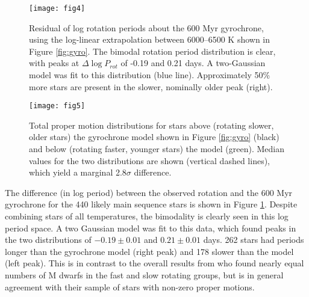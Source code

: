 \documentclass[manuscript, letterpaper]{aastex6}
\begin{document}
\begin{figure}[]
\centering
\texttt{[image: fig4]}
\caption{Residual of log rotation periods about the \citet{meibom2011} 600 Myr gyrochrone, using the log-linear extrapolation between 6000--6500 K shown in Figure \ref{fig:gyro}. The bimodal rotation period distribution is clear, with peaks at $\Delta \log P_{rot}$ of -0.19 and 0.21 days. A two-Gaussian model was fit to this distribution (blue line).
Approximately 50\% more stars are present in the slower, nominally older peak (right).}
\label{fig:diff}
\end{figure}



\begin{figure}[]
\centering
\texttt{[image: fig5]}
\caption{Total proper motion distributions for stars above (rotating slower, older stars) the gyrochrone model shown in Figure \ref{fig:gyro} (black) and below (rotating faster, younger stars) the model (green). Median values for the two distributions are shown (vertical dashed lines), which yield a marginal 2.8$\sigma$ difference.
}
\label{fig:pm}
\end{figure}


\clearpage

The difference (in log period) between the observed rotation and the 600 Myr gyrochrone for the 440 likely main sequence stars is shown in Figure \ref{fig:diff}. Despite combining stars of all temperatures, the bimodality is clearly seen in this log period space. A two Gaussian model was fit to this data, which found peaks in the two distributions of $-0.19 \pm 0.01$ and $0.21 \pm 0.01$ days.  262 stars had periods longer than the gyrochrone model (right peak) and 178 slower than the model (left peak). This is in contrast to the overall results from \citet{mcquillan2013} who found nearly equal numbers of M dwarfs in the fast and slow rotating groups, but is in general agreement with their sample of stars with non-zero proper motions. 
\end{document}
